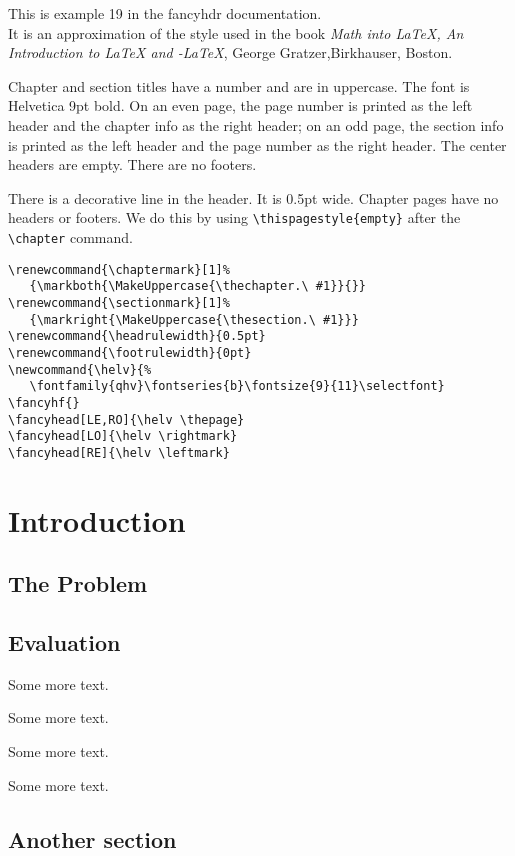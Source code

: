 \documentclass[openany]{book}
\renewcommand{\chaptermark}[1]%
   {\markboth{\MakeUppercase{\thechapter.\ #1}}{}}
\renewcommand{\sectionmark}[1]%
   {\markright{\MakeUppercase{\thesection.\ #1}}}
\renewcommand{\headrulewidth}{0.5pt}
\renewcommand{\footrulewidth}{0pt}
\newcommand{\helv}{%
   \fontfamily{qhv}\fontseries{b}\fontsize{9}{11}\selectfont}
\def\ams/{\protect\pAmS}
\def\pAmS{{\the\textfont2
        A\kern-.1667em\lower.5ex\hbox{M}\kern-.125emS}}
\def\amslatex/{\ams/-\LaTeX}
\begin{document}
\tableofcontents

\bigskip

\begin{boxedminipage}{\textwidth}
This is example 19 in the fancyhdr documentation.\\
It is an approximation of the style used in the book 
\textit{Math into LaTeX, An Introduction to \LaTeX{} and \amslatex/}, George Gratzer,Birkhauser, Boston.

Chapter and section titles have a number and are in uppercase. The font is Helvetica 9pt bold.
On an even page, the page number is printed as the left header and
the chapter info as the right header; on an odd page, the section info
is printed as the left header and the page number as the right header.  The
center headers are empty.  There are no footers.

There is a decorative line in the header.  It is 0.5pt wide.
Chapter pages have no headers or footers. We do this by using \verb|\thispagestyle{empty}| after the \verb|\chapter| command.

\begin{verbatim}
\renewcommand{\chaptermark}[1]%
   {\markboth{\MakeUppercase{\thechapter.\ #1}}{}}
\renewcommand{\sectionmark}[1]%
   {\markright{\MakeUppercase{\thesection.\ #1}}}
\renewcommand{\headrulewidth}{0.5pt}
\renewcommand{\footrulewidth}{0pt}
\newcommand{\helv}{%
   \fontfamily{qhv}\fontseries{b}\fontsize{9}{11}\selectfont}
\fancyhf{}
\fancyhead[LE,RO]{\helv \thepage}
\fancyhead[LO]{\helv \rightmark}
\fancyhead[RE]{\helv \leftmark}
\end{verbatim}
\end{boxedminipage}

\chapter{Introduction}
\thispagestyle{empty}

\lipsum

\section{The Problem}
\label{sec:problem}

\lipsum[3]

\section{Evaluation}

\lipsum

Some more text.

Some more text.

Some more text.

Some more text.


\section{Another section}

\lipsum[3]
\end{document}
